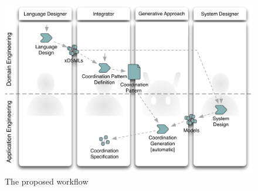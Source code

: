 	




\begin{figure}
	\begin{center}
		\includegraphics[width=.6\textwidth]{bcool/figs/process}
		\caption{The proposed workflow}
		\label{fig:proposedworkflow}
	\end{center}
\end{figure}

